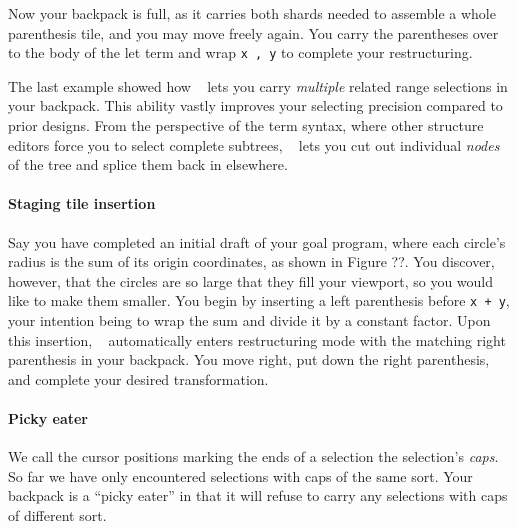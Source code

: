 

Now your backpack is full, as it carries both shards
needed to assemble a whole parenthesis tile,
and you may move freely again.
You carry the parentheses over to the body of the
let term and wrap \texttt{x , y} to complete your
restructuring.

The last example showed how \tylr~ lets you carry \emph{multiple}
related range selections in your backpack.
This ability vastly improves your selecting precision
compared to prior designs.
From the perspective of the term syntax,
where other structure editors force you to select
complete subtrees, \tylr~ lets you cut out individual
\emph{nodes} of the tree and splice them back in
elsewhere.

\paragraph{Staging tile insertion}

Say you have completed an initial draft of your goal program,
where each circle's radius is the sum of its origin
coordinates, as shown in Figure ??.
You discover, however, that the circles are so large that
they fill your viewport, so you would like to make them smaller.
You begin by inserting a left parenthesis
before \texttt{x + y}, your intention being to wrap
the sum and divide it by a constant factor.
Upon this insertion, \tylr~ automatically enters
restructuring mode with the matching right parenthesis
in your backpack.
You move right, put down the right parenthesis,
and complete your desired transformation.




\paragraph{Picky eater}
We call the cursor positions marking the ends of a selection
the selection's \emph{caps}.
So far we have only encountered selections with caps
of the same sort.
Your backpack is a ``picky eater'' in that
it will refuse to carry any selections with caps of
different sort.

